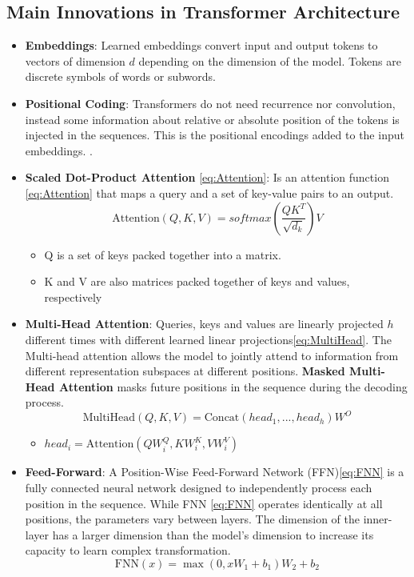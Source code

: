 \subsection{Main Innovations in Transformer Architecture}  
\begin{itemize}
    \item \textbf{Embeddings}: Learned embeddings convert input and output tokens to vectors of dimension $d$ depending on the dimension of the model. Tokens are discrete symbols of words or subwords.
    
    \item \textbf{Positional Coding}:  
    Transformers do not need recurrence nor convolution, instead some information about relative or absolute position of the tokens is injected in the sequences. This is the positional encodings added to the input embeddings. \cite{vaswani2017attention}.  
    \item  \textbf{Scaled Dot-Product Attention} \ref{eq:Attention}: Is an attention function \ref{eq:Attention} that maps a query and a set of key-value pairs to an output.
    \begin{equation}
        \label{eq:Attention}
        \text{Attention}(Q,K,V) = softmax(\frac{QK^T}{\sqrt{d_k}})V 
    \end{equation} 
    \begin{itemize}
        \item Q is a set of keys packed together into a matrix.
        \item K and V are also matrices packed together of keys and values, respectively
    \end{itemize}
    \item \textbf{Multi-Head Attention}:  Queries, keys and values are linearly projected $h$ different times with different learned linear projections\ref{eq:MultiHead}. The Multi-head attention allows the model to jointly attend to information from different representation subspaces at different positions. \textbf{Masked Multi-Head Attention} masks future positions in the sequence during the decoding process\cite{vaswani2017attention}.
    \begin{equation}
        \label{eq:MultiHead}
        \text{MultiHead}(Q,K,V) = \text{Concat}(head_1, ..., head_h)W^O  
    \end{equation}
    \begin{itemize}
        \item $head_i = \text{Attention}(QW_i^Q, KW_i^K,VW_i^V)$
    \end{itemize}
    \item \textbf{Feed-Forward}:  A Position-Wise Feed-Forward Network (FFN)\ref{eq:FNN} is a fully connected neural network designed to independently process each position in the sequence.  While FNN \ref{eq:FNN} operates identically at all positions, the parameters vary between layers. The dimension of the inner-layer has a larger dimension than the model's dimension to increase its capacity to learn complex transformation\cite{vaswani2017attention}.
    \begin{equation}
        \label{eq:FNN}
        \text{FNN}(x) = \max(0,xW_1+b_1)W_2+b_2
    \end{equation}
\end{itemize}
